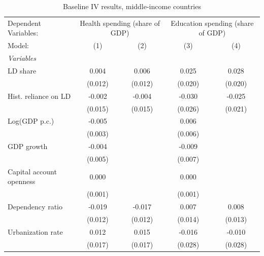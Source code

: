
\begin{table}[htbp]
   \caption{\label{tab:results_baseline_iv_overall_other} Baseline IV results, middle-income countries}
   \centering
   \begin{tabular}{lcccc}
      \tabularnewline \midrule \midrule
      Dependent Variables: & \multicolumn{2}{c}{Health spending (share of GDP)} & \multicolumn{2}{c}{Education spending (share of GDP)}\\
      Model:                     & (1)               & (2)               & (3)               & (4)\\  
      \midrule
      \emph{Variables}\\
      LD share                   & 0.004             & 0.006             & 0.025             & 0.028\\   
                                 & (0.012)           & (0.012)           & (0.020)           & (0.020)\\   
      Hist. reliance on LD       & -0.002            & -0.004            & -0.030            & -0.025\\   
                                 & (0.015)           & (0.015)           & (0.026)           & (0.021)\\   
      Log(GDP p.c.)              & -0.005            &                   & 0.006             &   \\   
                                 & (0.003)           &                   & (0.006)           &   \\   
      GDP growth                 & -0.004            &                   & -0.009            &   \\   
                                 & (0.005)           &                   & (0.007)           &   \\   
      Capital account openness   & 0.000             &                   & 0.000             &   \\   
                                 & (0.001)           &                   & (0.001)           &   \\   
      Dependency ratio           & -0.019            & -0.017            & 0.007             & 0.008\\   
                                 & (0.012)           & (0.012)           & (0.014)           & (0.013)\\   
      Urbanization rate          & 0.012             & 0.015             & -0.016            & -0.010\\   
                                 & (0.017)           & (0.017)           & (0.028)           & (0.028)\\   

\end{tabular}
\end{table}
